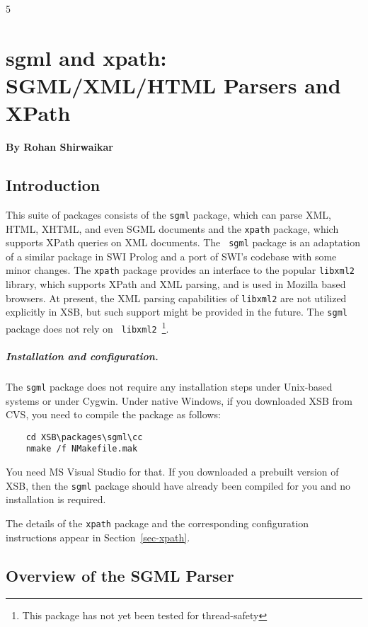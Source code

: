 5
\chapter{sgml and xpath: SGML/XML/HTML Parsers and XPath}

  \begin{center}
    {\Large {\bf By Rohan Shirwaikar}}
  \end{center}



\section{Introduction}
This suite of packages consists of the {\tt sgml} package, which can
parse XML, HTML, XHTML, and even SGML documents and the {\tt xpath}
package, which supports XPath queries on XML documents.  The {\tt
  sgml} package is an adaptation of a similar package in SWI Prolog
and a port of SWI's codebase with some minor changes. The {\tt xpath}
package provides an interface to the popular {\tt libxml2} library,
which supports XPath and XML parsing, and is used in Mozilla based
browsers. At present, the XML parsing capabilities of {\tt libxml2}
are not utilized explicitly in XSB, but such support might be provided
in the future. The {\tt sgml} package does not rely on {\tt
  libxml2}~\footnote{This package has not yet been tested for
  thread-safety}.

\paragraph{Installation and configuration.}
The {\tt sgml} package does not require any installation steps under
Unix-based systems or under Cygwin. Under native Windows, if you downloaded XSB
from CVS, you need to compile the package as follows:
\begin{verbatim}
    cd XSB\packages\sgml\cc
    nmake /f NMakefile.mak
\end{verbatim}
You need MS Visual Studio for that. If you downloaded a prebuilt version
of XSB, then the {\tt sgml}  package should have already been compiled for you
and no installation is required.

The details of the {\tt xpath} package and the corresponding configuration
instructions appear in Section~\ref{sec-xpath}.

\section{Overview of the SGML Parser}


